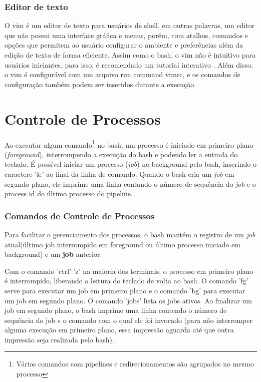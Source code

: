 \documentclass[oneside, 11 pt]{article}
\begin{document}
	\section{Editor de texto}
	O vim é um editor de texto para usuários de shell, em outras palavras, um editor que não possui uma interface gráfica e menus, porém, com atalhos, comandos e opções que permitem ao usuário configurar o ambiente e preferências além da edição de texto de forma eficiente. Assim como o bash, o vim não é intuitivo para usuários iniciantes, para isso, é recomendado um tutorial interativo \cite{vimt}. Além disso, o vim é configurável com um arquivo run command vimrc, e os comandos de configuração também podem ser inseridos durante a execução.
	
	\pagebreak
	\part{Controle de Processos}
	
	Ao executar algum comando\footnote{Vários comandos com pipelines e redirecionamentos são agrupados no mesmo processo} no bash, um processo é iniciado em primeiro plano (\textit{foreground}), interrompendo a execução do bash e podendo ler a entrada do teclado. É possível iniciar um processo (\textit{job}) no background pelo bash, inserindo o caractere '\&' ao final da linha de comando. Quando o bash cria um \textit{job} em segundo plano, ele imprime uma linha contando o número de sequência do \textit{job} e o process id do último processo do pipeline.
	
	\section{Comandos de Controle de Processos}
	Para facilitar o gerenciamento dos processos, o bash mantém o registro de um \textit{job} atual(último job interrompido em foreground ou último processo iniciado em background) e um \textbf{job} anterior.
	
	 Com o comando 'ctrl' 'z' na maioria dos terminais, o processo em primeiro plano é interrompido, liberando a leitura do teclado de volta ao bash. O comando 'fg' serve para executar um job em primeiro plano e o comando 'bg' para executar um job em segundo plano. O comando 'jobs' lista os jobs ativos. Ao finalizar um job em segundo plano, o bash imprime uma linha contendo o número de sequência do job e o comando com o qual ele foi invocado (para não interromper alguma execução em primeiro plano, essa impressão aguarda até que outra impressão seja realizada pelo bash).
	 
\end{document}
